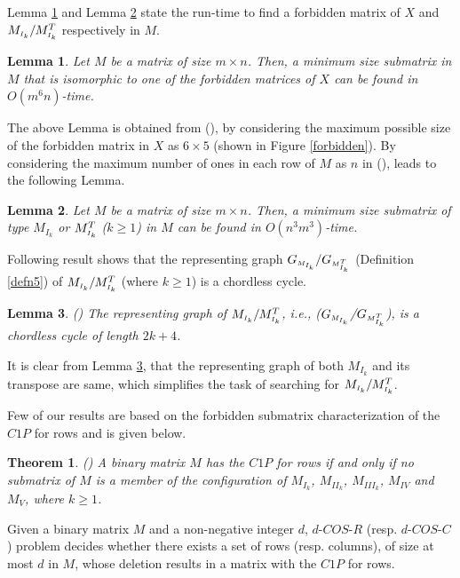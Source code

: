 \documentclass[review, 1p]{elsarticle}
\newtheorem{theorem}{Theorem}
\newtheorem{lemma}{Lemma}
\begin{document}
\noindent Lemma \ref{prop1} and Lemma \ref{prop2} state the run-time to find a forbidden matrix of $X$ and $M_{\mathsmaller I_{k}}/M^{T}_{\mathsmaller{I_{k}}}$ respectively in $M$.
\begin{lemma}\label{prop1}
\textup{} \textit{Let $M$ be a matrix of size $m \times n$. Then, a minimum size submatrix in $M$ that is isomorphic to one of the forbidden matrices of $X$ can be found in $O(m^{6}n)$-time}. \end{lemma}
The above Lemma is obtained from (\cite[Proposition 3.2]{dom2009recognition}), by considering the maximum possible size of the forbidden matrix in $X$ as $6 \times 5$ (shown in Figure \ref{forbidden}). By considering the maximum number of ones in each row of $M$ as $n$ in (\cite[Proposition 3.4]{dom2009recognition}), leads to the following Lemma.\begin{lemma}\label{prop2}Let $M$ be a matrix of size $m \times n$. Then, a minimum size submatrix of type $M_{I_{k}}$ or $M^{T}_{\mathsmaller{I_{k}}}$  ($k \geq 1$) in $M$ can be found in $O(n^{3}m^{3})$-time.\end{lemma}
Following result shows that the representing graph $G_{\mathsmaller{M}_{I_{k}}}/G_{\mathsmaller{M}^{T}_{\mathsmaller{I_{k}}}}$ (Definition \ref{defn5}) of $M_{\mathsmaller I_{k}}/M^{T}_{\mathsmaller{I_{k}}}$ (where $k \geq 1$) is a chordless cycle.
\begin{lemma} \label{prop3} \textup{(\cite[Observation 3.1]{dom2009recognition})} The representing graph of $M_{\mathsmaller I_{k}}/ M^{T}_{\mathsmaller{I_{k}}}$, i.e., 
\textup{($G_{\mathsmaller{M}_{I_{k}}}$/$G_{\mathsmaller{M}^{T}_{\mathsmaller{I_{k}}}}$)}, is a chordless cycle of length $2k+4$.
\end{lemma}
It is clear from Lemma \ref{prop3}, that the representing graph of both $M_{I_{k}}$ and its transpose are same, which simplifies the task of searching for $M_{\mathsmaller I_{k}}/M^{T}_{\mathsmaller{I_{k}}}$. 

Few of our results are based on the forbidden submatrix characterization of the $C1P$ for rows and is given below.
\begin{theorem}\label{forbc1p}\textup{(\cite[Theorem 9]{tucker1972structure})}
A binary matrix $M$ has the $C1P$ for rows if and only if no submatrix of $M$ is a member of the configuration of $M_{I_{k}}$, $M_{II_{k}}$, $M_{III_{k}}$, $M_{IV}$ and $M_{V}$, where $k \geq 1$.
\end{theorem}
Given a binary matrix $M$ and a non-negative integer $d$, $d$-$COS$-$R$ (resp. $d$-$COS$-$C$) \label{dcosr}problem decides whether there exists a set of rows (resp. columns), of size at most $d$ in $M$, whose deletion results in a matrix with the $C1P$ for rows.  
\end{document}
